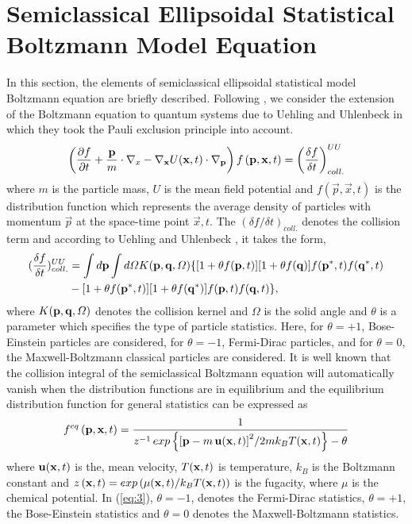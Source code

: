 \documentclass{rsproca}%
\begin{document}
\section{Semiclassical Ellipsoidal Statistical Boltzmann Model Equation}
\label{sec:2}
In this section, the elements of semiclassical ellipsoidal statistical model Boltzmann equation are briefly described.   Following \cite{PhysRev.43.552,KadanoffBaym}, we consider the extension of the Boltzmann equation to quantum systems due to Uehling and Uhlenbeck  in which they took the Pauli exclusion principle into account.
\begin{equation}
\left(\frac{\partial f}{\partial t}+\frac{\bf p}{m}\cdot {\bf\nabla }_x-{\bf \nabla}_{\bf x} U({\bf x},t)\cdot {\bf\nabla }_{\bf p}\right)f\left({\bf p},{\bf x},t\right)=\left(\frac{\delta f}{\delta t}\right)^{UU}_{coll.}
\end{equation}
where $m$ is the particle mass, $U$ is the mean field potential and $f(\vec p, \vec x, t)$ is the distribution function
which represents the average density of particles with momentum $\vec p$ at the space-time point $\vec x, t$. The $(\delta f
/\delta t)_{coll.}$ denotes the collision term and according to Uehling and Uhlenbeck \cite{PhysRev.43.552}, it takes the form,
\begin{align}
(\frac{\delta f} {\delta t})^{UU}_{coll.} &= \int d {\bf p} \int d\Omega
K({\bf p}, {\bf q}, \Omega) \{ [ 1+ \theta f({\bf p}, t)][1+ \theta f({\bf q})]f({\bf p}^*, t)f({\bf q}^*, t) \nonumber \\
&- [ 1+ \theta f({\bf p}^*, t)][1+ \theta f({\bf q}^*)]f({\bf p}, t)f({\bf q}, t) \},
\end{align}
where $K({\bf p}, {\bf q}, \Omega)$ denotes the collision kernel and $\Omega$ is the solid angle and $\theta$ is a parameter which specifies the type of particle statistics.   Here, for $\theta=+1$, Bose-Einstein particles are considered, for $\theta=-1$, Fermi-Dirac particles, and for $\theta=0$, the Maxwell-Boltzmann classical particles are considered.  It is well known that the collision integral of the semiclassical Boltzmann equation will automatically vanish when the distribution functions are in equilibrium and the equilibrium distribution function for general statistics can be expressed as
\begin{equation}
f^{eq}\left({\bf p},{\bf x},t\right) =\frac{1}{z^{-1}\,exp\left\{{\left[{\bf p}-m\,{\bf u}({\bf x},t) \right]}^2/2mk_BT({\bf x},t)\right\} -\theta }
\end{equation}
where $ {\bf u}({\bf x},t)$ is the, mean velocity, $T({\bf x},t)$ is temperature, $k_B$ is the Boltzmann constant and $z\left({\bf x},t\right)= exp\left({\mu ({\bf x},t)/k_BT({\bf x},t)}\right)$ is the fugacity, where $\mu$ is the chemical potential.  In (\ref{eq:3}), \(\theta=-1\), denotes the Fermi-Dirac statistics, \(\theta=+1\), the Bose-Einstein statistics and \(\theta=0\) denotes the Maxwell-Boltzmann statistics.
\end{document}
